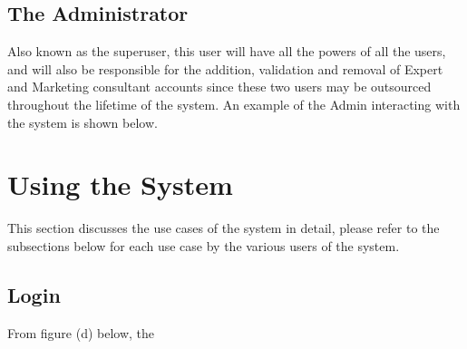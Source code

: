\documentclass[12pt,a4paper]{article}
\begin{document}
		 \subsection{The Administrator}
		 Also known as the superuser, this user will have all the powers of all the users, and will also be responsible for the addition, validation and removal of Expert and Marketing consultant accounts since these two users may be outsourced throughout the lifetime of the system. An example of the Admin interacting with the system is shown below.
		 
	\section{Using the System}
	 This section discusses the use cases of the system in detail, please refer to the subsections below for each use case by the various users of the system.
	 	\subsection{Login}
	 	 From figure (d) below, the 
		 
	
\end{document}
